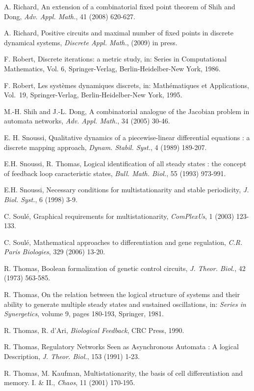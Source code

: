 \documentclass[11pt]{article}
\begin{document}
\begin{thebibliography}{7}
A. Richard, An extension of a combinatorial fixed point theorem of
Shih and Dong, {\emph{Adv. Appl. Math.}}, 41 (2008) 620-627.  

A. Richard, Positive circuits and maximal number of fixed points in
discrete dynamical systems, {\emph{Discrete Appl. Math.}},
(2009) in press.

F. Robert, Discrete iterations: a metric study, in: Series in
Computational Mathematics, Vol. 6, Springer-Verlag,
Berlin-Heidelber-New York, 1986.

F. Robert, Les syst\`emes dynamiques discrets, in: Math\'ematiques et
Applications, Vol.~19, Springer-Verlag, Berlin-Heidelber-New York,
1995.

M.-H. Shih and J.-L. Dong, A combinatorial analogue of the Jacobian
problem in automata networks, {\emph{Adv. Appl. Math.}}, 34 (2005)
30-46.

E. H. Snoussi, Qualitative dynamics of a piecewise-linear differential
equations : a discrete mapping approach,
{\emph{Dynam. Stabil. Syst.}}, 4 (1989) 189-207.

E.H. Snoussi, R. Thomas, Logical identification of all steady states :
the concept of feedback loop caracteristic states,
{\emph{Bull. Math. Biol.}}, 55 (1993) 973-991.

E.H. Snoussi, Necessary conditions for multistationarity and stable
periodicity, {\emph{J. Biol. Syst.}}, 6 (1998) 3-9.

C. Soul\'e, Graphical requirements for multistationarity,
\emph{ComPlexUs}, 1 (2003) 123-133.

C. Soul\'e, Mathematical approaches to differentiation and gene
regulation, \emph{C.R. Paris Biologies}, 329 (2006) 13-20.

R. Thomas, Boolean formalization of genetic control
circuits, {\emph{J. Theor. Biol.}}, 42 (1973) 563-585.

R. Thomas, On the relation between the logical structure of systems
and their ability to generate multiple steady states and sustained
oscillations, in: \emph{Series in Synergetics}, volume 9, pages
180-193, Springer, 1981.

R. Thomas, R. d'Ari, \emph{Biological Feedback}, CRC Press, 1990.

R. Thomas, Regulatory Networks Seen as Asynchronous Automata : A
logical Description, {\emph{J. Theor. Biol.}}, 153
(1991) 1-23.

R. Thomas, M. Kaufman, Multistationarity, the basis of cell
differentiation and memory. I. \& II., \emph{Chaos}, 11 (2001)
170-195.

\end{thebibliography}
\end{document}
